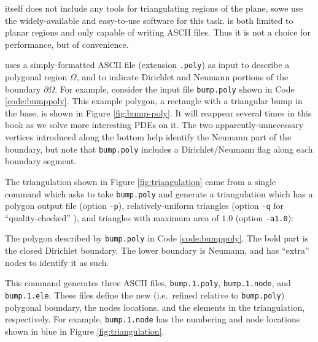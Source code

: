 \PETSc itself does not include any tools for triangulating regions of the plane, sowe use the widely-available and easy-to-use \Triangle{} software \citep{Shewchuk1996} for this task.  \Triangle is both limited to planar regions and only capable of writing ASCII files.  Thus it is not a choice for performance, but of convenience.

\Triangle uses a simply-formatted ASCII file (extension \texttt{.poly}) as input to describe a polygonal region $\Omega$, and to indicate Dirichlet and Neumann portions of the boundary $\partial \Omega$.  For example, consider the input file \texttt{bump.poly} shown in Code \ref{code:bumppoly}.  This example polygon, a rectangle with a triangular bump in the base, is shown in Figure \ref{fig:bump-poly}.  It will reappear several times in this book as we solve more interesting PDEs on it.  The two apparently-unnecessary vertices introduced along the bottom help identify the Neumann part of the boundary, but note that \texttt{bump.poly} includes a Dirichlet/Neumann flag along each boundary segment.


The triangulation shown in Figure \ref{fig:triangulation} came from a single command which asks \Triangle to take \texttt{bump.poly} and generate a triangulation which has a polygon output file (option \texttt{-p}), relatively-uniform triangles (option \texttt{-q} for ``quality-checked'' \citep{Shewchuk1996}), and triangles with maximum area of $1.0$ (option \texttt{-a1.0}):
\begin{marginfigure}

\caption{The polygon described by \texttt{bump.poly} in Code \ref{code:bumppoly}.  The bold part is the closed Dirichlet boundary.  The lower boundary is Neumann, and has ``extra'' nodes to identify it as such.}
\label{fig:bump-poly}
\end{marginfigure}
This command generates three ASCII files, \texttt{bump.1.poly}, \texttt{bump.1.node}, and  \texttt{bump.1.ele}.  These files define the new (i.e.~refined relative to \texttt{bump.poly}) polygonal boundary, the nodes locations, and the elements in the triangulation, respectively.  For example, \texttt{bump.1.node} has the numbering and node locations shown in blue in Figure \ref{fig:triangulation}.

